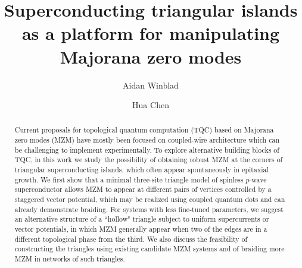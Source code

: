 \documentclass[aps,prb,twocolumn,showpacs,amsmath,amssymb,superscriptaddress]{revtex4-2}
\begin{document}
\title{Superconducting triangular islands as a platform for manipulating Majorana zero modes}

\author{Aidan Winblad}

\author{Hua Chen}

\begin{abstract}
Current proposals for topological quantum computation (TQC) based on Majorana zero modes (MZM) have mostly been focused on coupled-wire architecture which can be challenging to implement experimentally. To explore alternative building blocks of TQC, in this work we study the possibility of obtaining robust MZM at the corners of triangular superconducting islands, which often appear spontaneously in epitaxial growth. We first show that a minimal three-site triangle model of spinless $p$-wave superconductor allows MZM to appear at different pairs of vertices controlled by a staggered vector potential, which may be realized using coupled quantum dots and can already demonstrate braiding. For systems with less fine-tuned parameters, we suggest an alternative structure of a ``hollow" triangle subject to uniform supercurrents or vector potentials, in which MZM generally appear when two of the edges are in a different topological phase from the third. We also discuss the feasibility of constructing the triangles using existing candidate MZM systems and of braiding more MZM in networks of such triangles.
\end{abstract}

\maketitle
\end{document}
